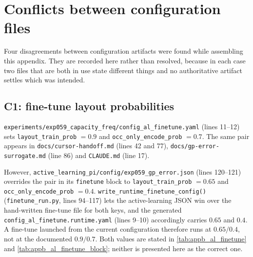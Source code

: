 \clearpage

\section{Conflicts between configuration files}
\label{sec:appb_conflicts}

Four disagreements between configuration artifacts were found while assembling this
appendix. They are recorded here rather than resolved, because in each case two files that
are both in use state different things and no authoritative artifact settles which was
intended.

\subsection*{C1: fine-tune layout probabilities}

\texttt{experiments/exp059\_capacity\_freq/config\_al\_finetune.yaml} (lines 11--12) sets
\texttt{layout\_train\_prob} $=0.9$ and \texttt{occ\_only\_encode\_prob} $=0.7$. The same
pair appears in \texttt{docs/cursor-handoff.md} (lines 42 and 77),
\texttt{docs/gp-error-surrogate.md} (line 86) and \texttt{CLAUDE.md} (line 17).

However, \texttt{active\_learning\_pi/config/exp059\_gp\_error.json} (lines 120--121)
overrides the pair in its \texttt{finetune} block to \texttt{layout\_train\_prob} $=0.65$
and \texttt{occ\_only\_encode\_prob} $=0.4$. \texttt{write\_runtime\_finetune\_config()}
(\texttt{finetune\_run.py}, lines 94--117) lets the active-learning JSON win over the
hand-written fine-tune file for both keys, and the generated
\texttt{config\_al\_finetune.runtime.yaml} (lines 9--10) accordingly carries $0.65$ and
$0.4$. A fine-tune launched from the current configuration therefore runs at $0.65/0.4$,
not at the documented $0.9/0.7$. Both values are stated in
\autoref{tab:appb_al_finetune} and \autoref{tab:appb_al_finetune_block}; neither is
presented here as the correct one.

